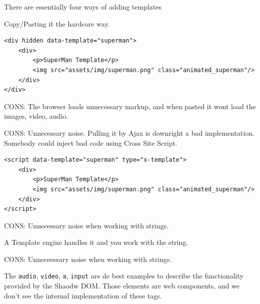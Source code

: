There are essentially four ways of adding templates

\label{ssec:01--hidden-elements}

Copy/Pasting it the hardcore way.

\begin{lstlisting}
<div hidden data-template="superman">
    <div>
        <p>SuperMan Template</p>
        <img src="assets/img/superman.png" class="animated_superman"/>
    </div>
</div>
\end{lstlisting}

\huge{CONS:} The browser loads unnecessary markup, and when pasted it wont load the images, video, audio.

\label{ssec:01--pull-content}

\huge{CONS:} Unnecessary noise. Pulling it by Ajax is downright a bad implementation.
Somebody could inject bad code using Cross Site Script.

\label{ssec:01--x-template}

\begin{lstlisting}
<script data-template="superman" type="x-template">
    <div>
        <p>SuperMan Template</p>
        <img src="assets/img/superman.png" class="animated_superman"/>
    </div>
</script>
\end{lstlisting}

\huge{CONS:} Unnecessary noise when working with strings.

\label{ssec:01--compiled-templates}

A Template engine handles it and you work with the string.

\huge{CONS:} Unneceessary noise when working with strings.

\label{sec:01--shadow-dom}

The \texttt{audio}, \texttt{video}, \texttt{a}, \texttt{input} are de best examples to describe the
functionality provided by the Shaodw DOM. Those elements are web components, and we don't see the
internal implementation of these tags.